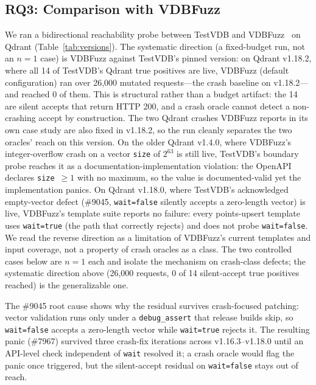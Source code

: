 \documentclass[sigconf]{acmart}
\begin{document}
\subsection{RQ3: Comparison with VDBFuzz}
\label{subsec:rq3}
We ran a bidirectional reachability probe between TestVDB and VDBFuzz~\cite{vdbfuzz26} on Qdrant (Table~\ref{tab:versions}). The systematic direction (a fixed-budget run, not an $n{=}1$ case) is VDBFuzz against TestVDB's pinned version: on Qdrant v1.18.2, where all 14 of TestVDB's Qdrant true positives are live, VDBFuzz (default configuration) ran over 26{,}000 mutated requests---the crash baseline on v1.18.2---and reached 0 of them. This is structural rather than a budget artifact: the 14 are silent accepts that return HTTP 200, and a crash oracle cannot detect a non-crashing accept by construction. The two Qdrant crashes VDBFuzz reports in its own case study are also fixed in v1.18.2, so the run cleanly separates the two oracles' reach on this version. On the older Qdrant v1.4.0, where VDBFuzz's integer-overflow crash on a vector \texttt{size} of $2^{63}$ is still live, TestVDB's boundary probe reaches it as a documentation-implementation violation: the OpenAPI declares \texttt{size}~$\geq 1$ with no maximum, so the value is documented-valid yet the implementation panics. On Qdrant v1.18.0, where TestVDB's acknowledged empty-vector defect (\#9045, \texttt{wait=false} silently accepts a zero-length vector) is live, VDBFuzz's template suite reports no failure: every points-upsert template uses \texttt{wait=true} (the path that correctly rejects) and does not probe \texttt{wait=false}. We read the reverse direction as a limitation of VDBFuzz's current templates and input coverage, not a property of crash oracles as a class. The two controlled cases below are $n{=}1$ each and isolate the mechanism on crash-class defects; the systematic direction above (26{,}000 requests, 0 of 14 silent-accept true positives reached) is the generalizable one.

The \#9045 root cause shows why the residual survives crash-focused patching: vector validation runs only under a \texttt{debug\_assert} that release builds skip, so \texttt{wait=false} accepts a zero-length vector while \texttt{wait=true} rejects it. The resulting panic (\#7967) survived three crash-fix iterations across v1.16.3--v1.18.0 until an API-level check independent of \texttt{wait} resolved it; a crash oracle would flag the panic once triggered, but the silent-accept residual on \texttt{wait=false} stays out of reach.
\end{document}
